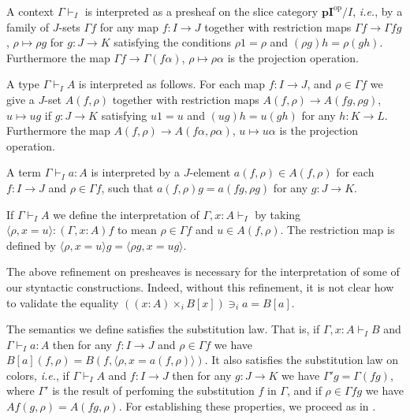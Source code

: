 \documentclass[english]{PaperTools/latex/lipics}
\newcommand\CTimes[2]{(#2) ×_{#1}}
\newcommand\op[1]{∋_{#1}}
\def\pI{\ensuremath{\mathbf{pI}}}
\def\ie{\textit{i.e.}}
\def\opp{\mathrm{op}}
\begin{document}
\bigskip
A context $Γ ⊢_I$ is interpreted as a presheaf on the slice category
$\pI^\opp/I$, \ie, by a family of $J$-sets $Γf$ for any map $f : I → J$
together with restriction maps $Γ f → Γ fg$, $ρ ↦ ρg$
for $g : J → K$ satisfying the conditions $ρ 1 = ρ$ and $(ρg)h = ρ(gh)$.
Furthermore the map $Γf → Γ(fα)$, $ρ ↦ ρα$ is the projection operation.

\medskip
A type $Γ ⊢_I A$ is interpreted as follows.
For each map $f : I → J$, and $ρ ∈ Γf$ we give a $J$-set $A(f,ρ)$
together with restriction maps $A(f,ρ) → A(fg,ρg)$, $u ↦ ug$ if $g : J → K$
satisfying $u1 = u$ and $(ug)h = u(gh)$ for any $h : K → L$.
Furthermore the map $A(f,ρ) → A(fα,ρα)$, $u ↦ uα$ is the projection operation.

\medskip
A term $Γ ⊢_I a : A$ is interpreted by a $J$-element $a(f,ρ) ∈ A(f,ρ)$
for each $f: I → J$ and $ρ ∈ Γf$, such that
$a(f,ρ)g = a(fg,ρg)$ for any $g : J → K$.

\medskip
If $Γ ⊢_I A$ we define the interpretation of $Γ,x:A ⊢_I$
by taking $⟨ρ,x=u⟩ : (Γ,x:A)f$ to mean $ρ ∈ Γf$ and $u ∈ A(f,ρ)$. The
restriction map is defined by $⟨ρ,x=u⟩g = ⟨ρ g, x=ug⟩$.

\bigskip
The above refinement on presheaves is necessary for the interpretation
of some of our styntactic constructions.  Indeed, without this refinement,
it is not clear how to validate the equality
${{(\CTimes i {x:A} B[x])} \op i a = B[a]}$.

\bigskip
The semantics we define satisfies the substitution law. That is, if $Γ,x:A ⊢_I B$
and $Γ ⊢_I a:A$ then for any $f : I → J$ and $ρ ∈ Γ f$ we have
$B[a](f,ρ) = B(f,⟨ρ,x=a(f,ρ)⟩)$.
It also satisfies the substitution law on colors, \ie, if $Γ ⊢_I A$ and
$f : I → J$ then for any $g : J → K$ we have $Γ'g = Γ(fg)$,
where $Γ'$ is the result of perfoming the substitution $f$ in $Γ$, and if
$ρ ∈ Γfg$ we have $Af (g,ρ) = A(fg,ρ)$.
For establishing these properties, we proceed as in \citet{Aczel98onrelating}.
\end{document}
